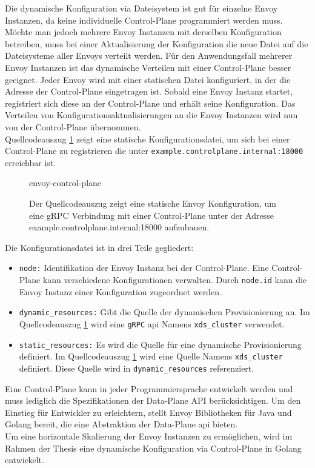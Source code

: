Die dynamische Konfiguration via Dateisystem ist gut für einzelne Envoy Instanzen, da keine individuelle Control-Plane programmiert werden muss.
Möchte man jedoch mehrere Envoy Instanzen mit derselben Konfiguration betreiben, muss bei einer Aktualisierung der Konfiguration die neue Datei auf die Dateisysteme aller Envoys verteilt werden.
Für den Anwendungsfall mehrerer Envoy Instanzen ist das dynamische Verteilen mit einer Control-Plane besser geeignet. Jeder Envoy wird mit einer statischen Datei konfiguriert, in der die Adresse der Control-Plane eingetragen ist. Sobald eine Envoy Instanz startet, registriert sich diese an der Control-Plane und erhält seine Konfiguration. Das Verteilen von Konfigurationsaktualisierungen an die Envoy Instanzen wird nun von der Control-Plane übernommen.
\\
Quellcodeauszug \ref{code:envoy-control-plane} zeigt eine statische Konfigurationsdatei, um sich bei einer Control-Plane zu registrieren die unter \verb|example.controlplane.internal:18000| erreichbar ist.
\begin{figure}
    {envoy-control-plane}
    \caption[Statische Envoy Konfiguration, um eine gRPC Verbindung mit einer Control-Plane aufzubauen.]{Der Quellcodeauszug zeigt eine statische Envoy Konfiguration, um eine gRPC Verbindung mit einer Control-Plane unter der Adresse {example.controlplane.internal:18000} aufzubauen.}
    \label{code:envoy-control-plane}
\end{figure}
Die Konfigurationsdatei ist in drei Teile gegliedert:
\begin{itemize}
  \item \verb|node:| Identifikation der Envoy Instanz bei der Control-Plane. Eine Control-Plane kann verschiedene Konfigurationen verwalten. Durch \verb|node.id| kann die Envoy Instanz einer Konfiguration zugeordnet werden.
  \item \verb|dynamic_resources:| Gibt die Quelle der dynamischen Provisionierung an. Im Quellcodeauszug \ref{code:envoy-control-plane} wird eine \verb|gRPC| \ac{api} Namens \verb|xds_cluster| verwendet.
  \item \verb|static_resources:| Es wird die Quelle für eine dynamische Provisionierung definiert. Im Quellcodeauszug \ref{code:envoy-control-plane} wird eine Quelle Namens \verb|xds_cluster| definiert. Diese Quelle wird in \verb|dynamic_resources| referenziert.
\end{itemize}
Eine Control-Plane kann in jeder Programmiersprache entwickelt werden und muss lediglich die Spezifikationen der Data-Plane API \cite{EnvoyproxyDataplaneapi2021} berücksichtigen. Um den Einstieg für Entwickler zu erleichtern, stellt Envoy Bibliotheken für Java und Golang bereit, die eine Abstraktion der Data-Plane \ac{api} bieten.
\\
Um eine horizontale Skalierung der Envoy Instanzen zu ermöglichen, wird im Rahmen der Thesis eine dynamische Konfiguration via Control-Plane in Golang entwickelt.

